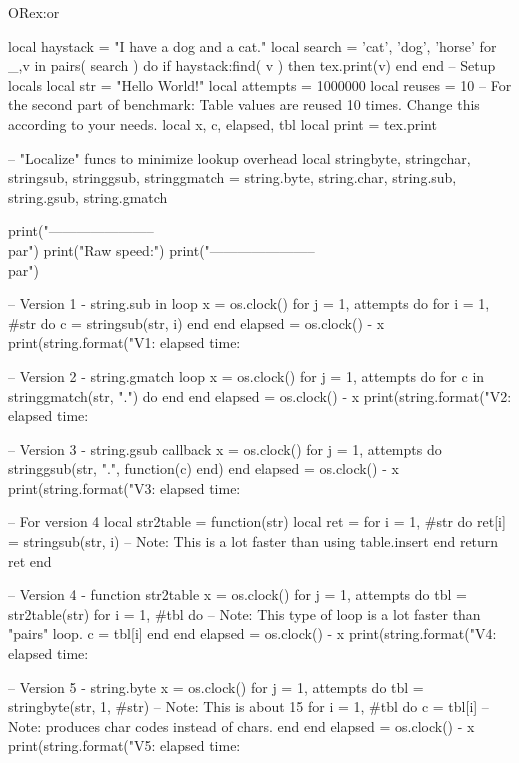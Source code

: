\begin{texexample}{OR}{ex:or}
\begin{luacode}
   local haystack = "I have a dog and a cat."
   local search = { 'cat', 'dog', 'horse' }
   for _,v in pairs( search ) do
      if haystack:find( v ) then
         tex.print(v)
      end
   end
-- Setup locals
local str = "Hello World!"
local attempts = 1000000
local reuses = 10 -- For the second part of benchmark: Table values are reused 10 times. Change this according to your needs.
local x, c, elapsed, tbl
local print = tex.print

-- "Localize" funcs to minimize lookup overhead
local stringbyte, stringchar, stringsub, stringgsub, stringgmatch = string.byte, string.char, string.sub, string.gsub, string.gmatch

print("-----------------------\\par")
print("Raw speed:")
print("-----------------------\\par")

-- Version 1 - string.sub in loop
x = os.clock()
for j = 1, attempts do
    for i = 1, #str do
        c = stringsub(str, i)
    end
end
elapsed = os.clock() - x
print(string.format("V1: elapsed time: %

-- Version 2 - string.gmatch loop
x = os.clock()
for j = 1, attempts do
    for c in stringgmatch(str, ".") do end
end
elapsed = os.clock() - x
print(string.format("V2: elapsed time: %

-- Version 3 - string.gsub callback
x = os.clock()
for j = 1, attempts do
    stringgsub(str, ".", function(c) end)
end
elapsed = os.clock() - x
print(string.format("V3: elapsed time: %

-- For version 4
local str2table = function(str)
    local ret = {}
    for i = 1, #str do
        ret[i] = stringsub(str, i) -- Note: This is a lot faster than using table.insert
    end
    return ret
end

-- Version 4 - function str2table
x = os.clock()
for j = 1, attempts do
    tbl = str2table(str)
    for i = 1, #tbl do -- Note: This type of loop is a lot faster than "pairs" loop.
        c = tbl[i]
    end
end
elapsed = os.clock() - x
print(string.format("V4: elapsed time: %

-- Version 5 - string.byte
x = os.clock()
for j = 1, attempts do
    tbl = {stringbyte(str, 1, #str)} -- Note: This is about 15%
    for i = 1, #tbl do
        c = tbl[i] -- Note: produces char codes instead of chars.
    end
end
elapsed = os.clock() - x
print(string.format("V5: elapsed time: %


\end{luacode}
\end{texexample}

